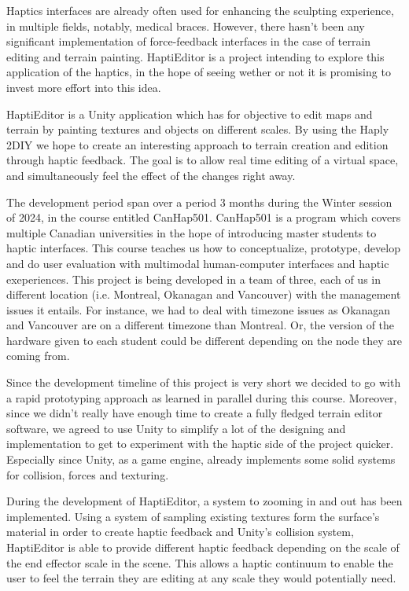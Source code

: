 Haptics interfaces are already often used for enhancing the sculpting experience, in multiple fields, notably, medical braces.
However, there hasn't been any significant implementation of force-feedback interfaces in the case of terrain editing and terrain painting.
HaptiEditor is a project intending to explore this application of the haptics, in the hope of seeing wether or not it is promising to invest more effort into this idea.

HaptiEditor is a Unity application which has for objective to edit maps and terrain by painting textures and objects on different scales. 
By using the Haply 2DIY we hope to create an interesting approach to terrain creation and edition through haptic feedback.
The goal is to allow real time editing of a virtual space, and simultaneously feel the effect of the changes right away.

The development period span over a period 3 months during the Winter session of 2024, in the course entitled CanHap501.
CanHap501 is a program which covers multiple Canadian universities in the hope of introducing master students to haptic interfaces. 
This course teaches us how to conceptualize, prototype, develop and do user evaluation with multimodal human-computer interfaces and haptic exeperiences.
This project is being developed in a team of three, each of us in different location (i.e. Montreal, Okanagan and Vancouver) with the management issues it entails. 
For instance, we had to deal with timezone issues as Okanagan and Vancouver are on a different timezone than Montreal. 
Or, the version of the hardware given to each student could be different depending on the node they are coming from.

Since the development timeline of this project is very short we decided to go with a rapid prototyping approach as learned in parallel during this course.
Moreover, since we didn't really have enough time to create a fully fledged terrain editor software,
we agreed to use Unity to simplify a lot of the designing and implementation to get to experiment with the haptic side of the project quicker.
Especially since Unity, as a game engine, already implements some solid systems for collision, forces and texturing.

During the development of HaptiEditor, a system to zooming in and out has been implemented. 
Using a system of sampling existing textures form the surface's material in order to create haptic feedback and Unity's collision system, HaptiEditor is able to provide different haptic feedback depending on the scale of the end effector scale in the scene.
This allows a haptic continuum to enable the user to feel the terrain they are editing at any scale they would potentially need.

